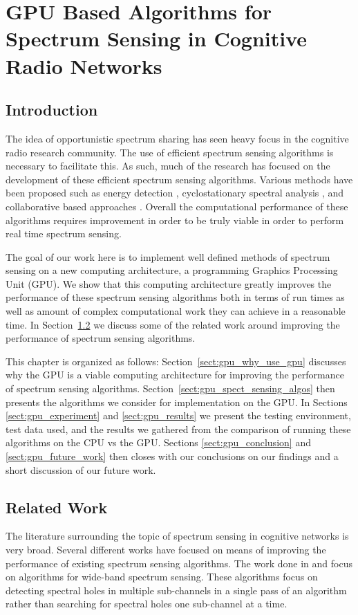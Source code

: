 \chapter{GPU Based Algorithms for Spectrum Sensing in Cognitive Radio Networks}
\label{chap:cognet_gpu}
\section{Introduction}
The idea of opportunistic spectrum sharing has seen heavy focus in the cognitive radio research community.  The use of efficient spectrum sensing algorithms is necessary to facilitate this.  As such, much of the research has focused on the development of these efficient spectrum sensing algorithms.  Various methods have been proposed such as energy detection \cite{CabTkaBro06}\cite{HurParWoo06}, cyclostationary spectral analysis \cite{FenBos07}\cite{OshClaEbe07}, and collaborative based approaches \cite{GanLi05}\cite{SadAzm08}.  Overall the computational performance of these algorithms requires improvement in order to be truly viable in order to perform real time spectrum sensing.

The goal of our work here is to implement well defined methods of spectrum sensing on a new computing architecture, a programming Graphics Processing Unit (GPU).  We show that this computing architecture greatly improves the performance of these spectrum sensing algorithms both in terms of run times as well as amount of complex computational work they can achieve in a reasonable time.  In Section~\ref{sect:gpu_related_work} we discuss some of the related work around improving the performance of spectrum sensing algorithms.  

This chapter is organized as follows: Section~\ref{sect:gpu_why_use_gpu} discusses why the GPU is a viable computing architecture for improving the performance of spectrum sensing algorithms.  Section~\ref{sect:gpu_spect_sensing_algos} then presents the algorithms we consider for implementation on the GPU.  In Sections \ref{sect:gpu_experiment} and \ref{sect:gpu_results} we present the testing environment, test data used, and the results we gathered from the comparison of running these algorithms on the CPU vs the GPU.  Sections \ref{sect:gpu_conclusion} and \ref{sect:gpu_future_work} then closes with our conclusions on our findings and a short discussion of our future work.

\section{Related Work}
\label{sect:gpu_related_work}
The literature surrounding the topic of spectrum sensing in cognitive networks is very broad.  Several different works have focused on means of improving the performance of existing spectrum sensing algorithms.  The work done in \cite{HurParWoo06} and \cite{QuaCuiSay08} focus on algorithms for wide-band spectrum sensing.  These algorithms focus on detecting spectral holes in multiple sub-channels in a single pass of an algorithm rather than searching for spectral holes one sub-channel at a time.

